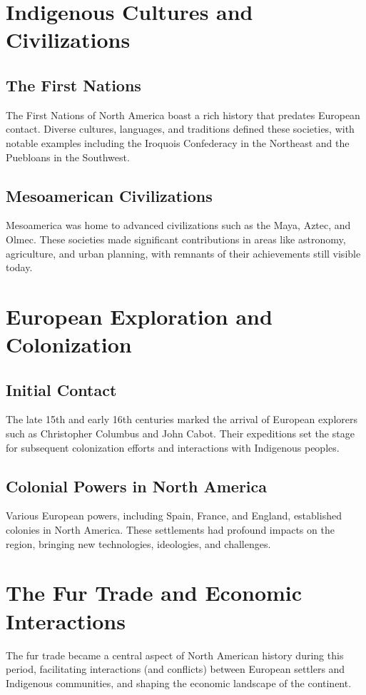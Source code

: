 \documentclass[a4paper,12pt]{book}
\begin{document}
\section{Indigenous Cultures and Civilizations}
\label{sec:indigenous-cultures}

\subsection{The First Nations}
The First Nations of North America boast a rich history that predates European contact. Diverse cultures, languages, and traditions defined these societies, with notable examples including the Iroquois Confederacy in the Northeast and the Puebloans in the Southwest.

\subsection{Mesoamerican Civilizations}
Mesoamerica was home to advanced civilizations such as the Maya, Aztec, and Olmec. These societies made significant contributions in areas like astronomy, agriculture, and urban planning, with remnants of their achievements still visible today.

\section{European Exploration and Colonization}
\label{sec:european-exploration-colonization}

\subsection{Initial Contact}
The late 15th and early 16th centuries marked the arrival of European explorers such as Christopher Columbus and John Cabot. Their expeditions set the stage for subsequent colonization efforts and interactions with Indigenous peoples.

\subsection{Colonial Powers in North America}
Various European powers, including Spain, France, and England, established colonies in North America. These settlements had profound impacts on the region, bringing new technologies, ideologies, and challenges.

\section{The Fur Trade and Economic Interactions}
\label{sec:fur-trade-economic-interactions}
The fur trade became a central aspect of North American history during this period, facilitating interactions (and conflicts) between European settlers and Indigenous communities, and shaping the economic landscape of the continent.
\end{document}
